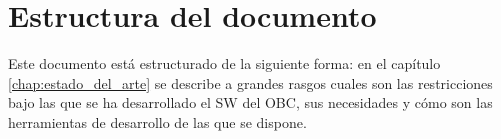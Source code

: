 \section{Estructura del documento}
\label{sec:estructura doc}

Este documento está estructurado de la siguiente forma: en el capítulo
\ref{chap:estado_del_arte} se describe a grandes rasgos cuales son las
restricciones bajo las que se ha desarrollado el SW del OBC, sus necesidades
y cómo son las herramientas de desarrollo de las que se dispone.\\


